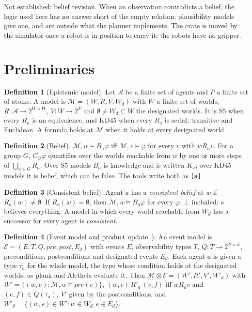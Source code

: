 \documentclass[11pt,a4paper]{article}
\theoremstyle{definition}
\newtheorem{definition}{Definition}
\newcommand{\Ag}{\mathcal{A}}
\newcommand{\Mod}{\mathcal{M}}
\newcommand{\Ev}{\mathcal{E}}
\newcommand{\prd}{\otimes}
\newcommand{\Bop}[1]{B_{#1}}
\newcommand{\Kop}[1]{K_{#1}}
\newcommand{\Cop}[1]{C_{#1}}
\newcommand{\code}[1]{\texttt{\small #1}}
\newcommand{\pre}{\mathit{pre}}
\newcommand{\post}{\mathit{post}}
\begin{document}
\noindent
Not established: belief revision. When an observation contradicts a belief,
the logic used here has no answer short of the empty relation;
plausibility models~\cite{baltag2008} give one, and are outside what the
planner implements. The crate is moved by the simulator once a robot is in
position to carry it: the robots have no gripper.

\section{Preliminaries}
\label{sec:prelim}

\begin{definition}[Epistemic model]
Let $\Ag$ be a finite set of agents and $P$ a finite set of atoms. A model is
$\Mod = (W, R, V, W_d)$ with $W$ a finite set of worlds,
$R : \Ag \to 2^{W\times W}$, $V : W \to 2^P$ and $\emptyset \neq W_d \subseteq W$
the designated worlds. It is $\mathrm{S5}$ when every $R_a$ is an equivalence,
and $\mathrm{KD45}$ when every $R_a$ is serial, transitive and Euclidean. A
formula holds at $\Mod$ when it holds at every designated world.
\end{definition}

\begin{definition}[Belief]
$\Mod, w \models \Bop{a}\varphi$ iff $\Mod, v \models \varphi$ for every $v$ with
$w R_a v$. For a group $G$, $\Cop{G}\varphi$ quantifies over the worlds reachable
from $w$ by one or more steps of $\bigcup_{a\in G} R_a$. Over $\mathrm{S5}$ models
$\Bop{a}$ is knowledge and is written $\Kop{a}$; over $\mathrm{KD45}$ models it
is belief, which can be false. The tools write both as \code{[a]}.
\end{definition}

\begin{definition}[Consistent belief]
\label{def:consistent}
Agent $a$ has a \emph{consistent belief} at $w$ if $R_a(w) \neq \emptyset$. If
$R_a(w) = \emptyset$, then $\Mod, w \models \Bop{a}\varphi$ for every $\varphi$,
$\bot$ included: $a$ believes everything. A model in which every world reachable
from $W_d$ has a successor for every agent is \emph{consistent}.
\end{definition}

\begin{definition}[Event model and product update~\cite{baltag1998}]
An event model is $\Ev = (E, T, Q, \pre, \post, E_d)$ with events $E$,
observability types $T$, $Q : T \to 2^{E\times E}$, preconditions, postconditions
and designated events $E_d$. Each agent $a$ is given a type $\tau_a$ for the
whole model, the type whose condition holds at the designated worlds, as plank
and Aletheia evaluate it. Then $\Mod \prd \Ev = (W', R', V', W'_d)$ with
$W' = \{(w,e) : \Mod, w \models \pre(e)\}$,
$(w,e)\, R'_a\, (v,f)$ iff $w R_a v$ and $(e,f) \in Q(\tau_a)$, $V'$ given by
the postconditions, and $W'_d = \{(w,e) \in W' : w \in W_d, e \in E_d\}$.
\end{definition}
\end{document}
